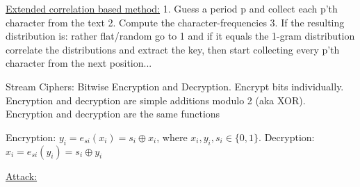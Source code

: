 \documentclass[landscape, a4paper]{article}
\begin{document}
\begin{minipage}[t]{0.2\linewidth}
	\begin{betterlist}
		\item \underline{Extended correlation based method:} 1. Guess a period p and collect each p’th character from the text 2. Compute the character-frequencies 3. If the resulting distribution is: rather flat/random go to 1 and if it equals the 1-gram distribution correlate the distributions and extract the key, then start collecting every p’th character from the next position...
	\end{betterlist}
	\begin{betterlist}
		\item \alert{Stream Ciphers:} Bitwise Encryption and Decryption. Encrypt bits individually. Encryption and decryption are simple additions modulo 2 (aka XOR). Encryption and decryption are the same functions
		\begin{betterlist}
			\item \alert{Encryption:} $y_i = e_{si}(x_i) = s_i \oplus x_i$, where $x_i, y_i, s_i \in \{0, 1\}$. \alert{Decryption:} $x_i = e_{si}(y_i) = s_i \oplus y_i$
			\begin{betterlist}
				\item \underline{Attack:}


\end{betterlist}
\end{betterlist}
\end{betterlist}
\end{minipage}
\end{document}
